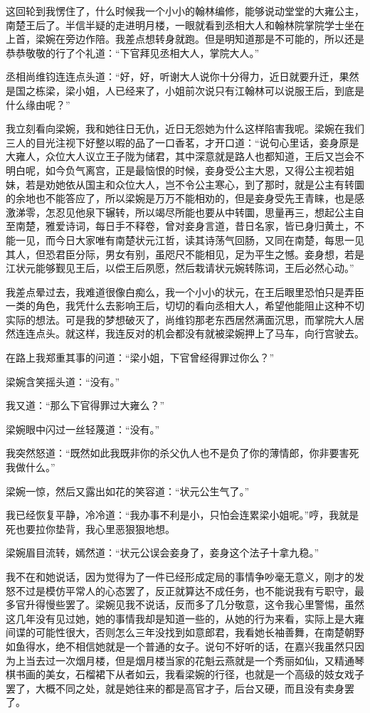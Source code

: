 这回轮到我愣住了，什么时候我一个小小的翰林编修，能够说动堂堂的大雍公主，南楚王后了。半信半疑的走进明月楼，一眼就看到丞相大人和翰林院掌院学士坐在上首，梁婉在旁边作陪。我差点想转身就跑。但是明知道那是不可能的，所以还是恭恭敬敬的行了个礼道：“下官拜见丞相大人，掌院大人。”

丞相尚维钧连连点头道：“好，好，听谢大人说你十分得力，近日就要升迁，果然是国之栋梁，梁小姐，人已经来了，小姐前次说只有江翰林可以说服王后，到底是什么缘由呢？”

我立刻看向梁婉，我和她往日无仇，近日无怨她为什么这样陷害我呢。梁婉在我们三人的目光注视下好整以暇的品了一口香茗，才开口道：“说句心里话，妾身原是大雍人，众位大人议立王子陇为储君，其中深意就是路人也都知道，王后又岂会不明白呢，如今负气离宫，正是最恼恨的时候，妾身受公主大恩，又得公主视若姐妹，若是劝她依从国主和众位大人，岂不令公主寒心，到了那时，就是公主有转圜的余地也不能答应了，所以梁婉是万万不能相劝的，但是妾身受先王青睐，也是感激涕零，怎忍见他泉下辗转，所以竭尽所能也要从中转圜，思量再三，想起公主自至南楚，雅爱诗词，每日手不释卷，曾对妾身言道，昔日名家，皆已身归黄土，不能一见，而今日大家唯有南楚状元江哲，读其诗荡气回肠，又同在南楚，每思一见其人，但恐君臣分际，男女有别，虽咫尺不能相见，足为平生之憾。妾身想，若是江状元能够觐见王后，以偿王后夙愿，然后栽请状元婉转陈词，王后必然心动。”

我差点晕过去，我难道很像白痴么，我一个小小的状元，在王后眼里恐怕只是弄臣一类的角色，我凭什么去影响王后，切切的看向丞相大人，希望他能阻止这种不切实际的想法。可是我的梦想破灭了，尚维钧那老东西居然满面沉思，而掌院大人居然连连点头。就这样，我连反对的机会都没有就被梁婉押上了马车，向行宫驶去。

在路上我郑重其事的问道：“梁小姐，下官曾经得罪过你么？”

梁婉含笑摇头道：“没有。”

我又道：“那么下官得罪过大雍么？”

梁婉眼中闪过一丝轻蔑道：“没有。”

我突然怒道：“既然如此我既非你的杀父仇人也不是负了你的薄情郎，你非要害死我做什么。”

梁婉一惊，然后又露出如花的笑容道：“状元公生气了。”

我已经恢复平静，冷冷道：“我办事不利是小，只怕会连累梁小姐呢。”哼，我就是死也要拉你垫背，我心里恶狠狠地想。

梁婉眉目流转，嫣然道：“状元公误会妾身了，妾身这个法子十拿九稳。”

我不在和她说话，因为觉得为了一件已经形成定局的事情争吵毫无意义，刚才的发怒不过是模仿平常人的心态罢了，反正就算达不成任务，也不能说我有亏职守，最多官升得慢些罢了。梁婉见我不说话，反而多了几分敬意，这令我心里警惕，虽然这几年没有见过她，她的事情我却是知道一些的，从她的行为来看，实际上是大雍间谍的可能性很大，否则怎么三年没找到如意郎君，我看她长袖善舞，在南楚朝野如鱼得水，绝不相信她就是一个普通的女子。说句不好听的话，在嘉兴我虽然只因为上当去过一次烟月楼，但是烟月楼当家的花魁云燕就是一个秀丽如仙，又精通琴棋书画的美女，石榴裙下从者如云，我看梁婉的行径，也就是一个高级的妓女戏子罢了，大概不同之处，就是她往来的都是高官才子，后台又硬，而且没有卖身罢了。

